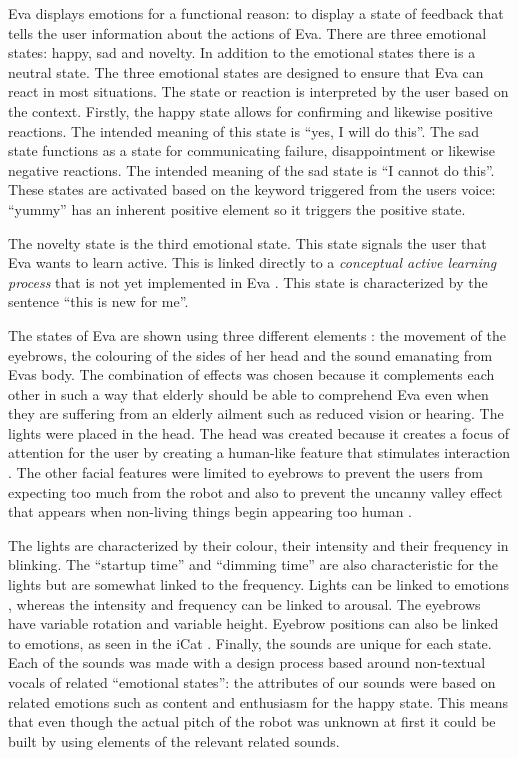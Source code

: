 \documentclass[project_eva.tex]{subfiles}
\begin{document}
Eva displays emotions for a functional reason: to display a state of feedback that tells the user information about the 
actions of Eva. There are three emotional states: happy, sad and novelty. In  addition to the emotional states there is a 
neutral state. The three emotional states are designed to ensure that Eva can react in most situations. The state or 
reaction is interpreted by the user based on the context. Firstly, the happy  state allows for confirming and likewise 
positive reactions. The intended meaning of this state is ``yes, I will do this''. The sad state functions as a state for communicating failure, disappointment or likewise negative reactions. The intended meaning of the sad state  is ``I cannot do this''. These states are activated based on the keyword triggered from the user\textquotesingle s voice: ``yummy'' has an inherent positive element so it triggers the positive state.

The novelty state is the third emotional state. This state signals the user that Eva wants to learn active. This is 
linked 
directly to a \textit{conceptual active learning process} that is not yet implemented in Eva \pageref{concept}. This 
state is characterized by the sentence ``this is new for me''.

The states of Eva are shown using three different elements \cite{Tech}: the movement of the eyebrows, the colouring of the sides of her head  and the sound emanating from Eva\textquotesingle s body. The combination of effects was chosen because it complements each other in such a way that elderly should be able to comprehend Eva even when they are suffering from an elderly ailment such as reduced vision or hearing. The lights were placed in the head. The head was 
created because it creates a focus of attention for the user by creating a human-like feature that stimulates interaction 
\cite{elderly}. The other facial features were limited to eyebrows to prevent the users from expecting too much from the 
robot and also to prevent the uncanny valley effect that appears when non-living things begin appearing too human 
\cite{uncanny}. 

The lights are characterized by their colour, their intensity and their frequency in blinking. The ``startup time'' and 
``dimming time'' are also characteristic for the lights but are somewhat linked to the frequency. Lights can be linked to 
emotions \cite{colour-emotion} , whereas the intensity and frequency can be linked to arousal. The eyebrows have variable 
rotation and variable height. Eyebrow positions can also be linked to emotions, as seen in the iCat \cite{iCat}. Finally, 
the sounds are unique for each state. Each of the sounds was made with a design process based around non-textual vocals 
of related ``emotional states'': the attributes of our sounds were based on related emotions  such as content and 
enthusiasm for the happy state. This means that even though the actual pitch of the robot was unknown at first it could 
be built by using elements \cite{sounds} of the relevant related sounds.
\end{document}
